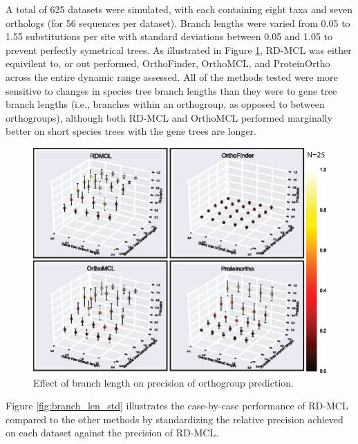 \documentclass[twocolumn]{bmcart}%
\begin{document}
A total of 625 datasets were simulated, with each containing eight taxa and seven orthologs (for 56 sequences per dataset). Branch lengths were varied from 0.05 to 1.55 substitutions per site with standard deviations between 0.05 and 1.05 to prevent perfectly symetrical trees. As illustrated in Figure \ref{fig:branch_len_3d}, RD-MCL was either equivilent to, or out performed, OrthoFinder, OrthoMCL, and ProteinOrtho across the entire dynamic range assessed. All of the methods tested were more sensitive to changes in species tree branch lengths than they were to gene tree branch lengths (i.e., branches within an orthogroup, as opposed to between orthogroups), although both RD-MCL and OrthoMCL performed marginally better on short species trees with the gene trees are longer.

\begin{figure}[t]
  \begin{center}
  \includegraphics[height=0.25\textheight]{../figures/branch_len_3D_scatter.eps}
\end{center}
\caption{Effect of branch length on precision of orthogroup prediction.}
\label{fig:branch_len_3d}
\end{figure}

Figure \ref{fig:branch_len_std} illustrates the case-by-case performance of RD-MCL compared to the other methods by standardizing the relative precision achieved on each dataset against the precision of RD-MCL.
\end{document}
